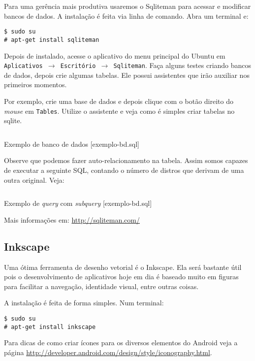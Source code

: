 Para uma gerência mais produtiva usaremos o Sqliteman para acessar e modificar bancos de dados. A instalação
é feita via linha de comando. Abra um terminal e:

\begin{flushleft}
\texttt{\$ sudo su\\
\# apt-get install sqliteman\\}
\end{flushleft}

Depois de instalado, acesse o aplicativo do menu principal do Ubuntu em \texttt{Aplicativos $\rightarrow$
Escritório $\rightarrow$ Sqliteman}. Faça alguns testes criando bancos de dados, depois crie algumas tabelas.
Ele possui assistentes que irão auxiliar nos primeiros momentos.

Por exemplo, crie uma base de dados e depois clique com o botão direito do \textit{mouse} em \texttt{Tables}.
Utilize o assistente e veja como é simples criar tabelas no sqlite.

\begin{listing}[H]
  \inputminted[linenos=true,frame=bottomline,tabsize=3]{ sql }{ source/exemplo-bd-1.sql }
  \caption{Exemplo de banco de dados [exemplo-bd.sql]}
\end{listing}

Observe que podemos fazer auto-relacionamento na tabela. Assim somos capazes de executar a seguinte SQL,
contando o número de distros que derivam de uma outra original. Veja:

\begin{listing}[H]
  \inputminted[linenos=true,frame=bottomline,tabsize=3]{ sql }{ source/exemplo-bd-2.sql }
  \caption{Exemplo de \textit{query} com \textit{subquery} [exemplo-bd.sql]}
\end{listing}

Mais informações em: \url{http://sqliteman.com/}

\subsection{Inkscape}

Uma ótima ferramenta de desenho vetorial é o Inkscape. Ela será bastante útil pois o desenvolvimento
de aplicativos hoje em dia é baseado muito em figuras para facilitar a navegação, identidade visual,
entre outras coisas.

A instalação é feita de forma simples. Num terminal:

\begin{flushleft}
\texttt{\$ sudo su\\
\# apt-get install inkscape\\}
\end{flushleft}

Para dicas de como criar ícones para os diversos elementos do Android veja a página
\url{http://developer.android.com/design/style/iconography.html}.
